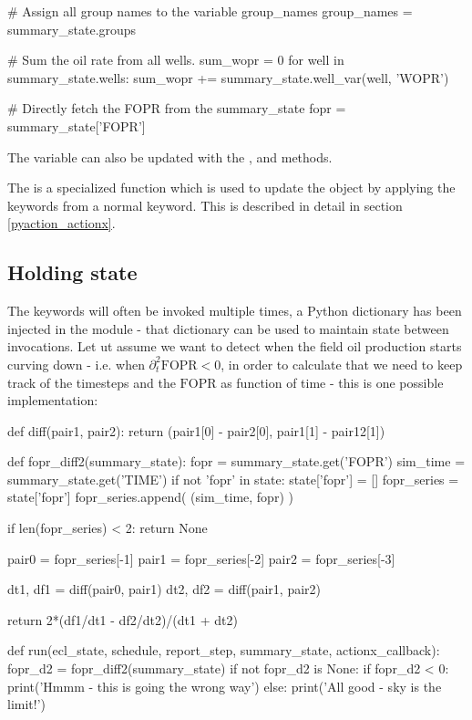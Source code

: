 \begin{description}
\begin{code}
    # Assign all group names to the variable group_names
    group_names = summary_state.groups

    # Sum the oil rate from all wells.
    sum_wopr = 0
    for well in summary_state.wells:
        sum_wopr += summary_state.well_var(well, 'WOPR')

    # Directly fetch the FOPR from the summary_state
    fopr = summary_state['FOPR'] 
  \end{code}
  The  variable can also be updated with the
  ,  and
   methods.
\item[\inlinecode{actionx\_callback}:] The  is a
  specialized function which is used to update the  object
  by applying the keywords from a normal \actionx{} keyword. This is described
  in detail in section \ref{pyaction_actionx}.
\end{description}

\subsection{Holding state}
The \pyaction{} keywords will often be invoked multiple times, a Python
dictionary  has been injected in the module - that dictionary
can be used to maintain state between invocations. Let ut assume we want to
detect when the field oil production starts curving down - i.e. when
$\partial^2_{t} \mathrm{FOPR} < 0$, in order to calculate that we need to keep
track of the timesteps and the $\mathrm{FOPR}$ as function of time - this is one
possible implementation:
\begin{code}
def diff(pair1, pair2):
    return (pair1[0] - pair2[0], pair1[1] - pair12[1])   

def fopr_diff2(summary_state):
    fopr = summary_state.get('FOPR')
    sim_time = summary_state.get('TIME')
    if not 'fopr' in state:
        state['fopr'] = []
    fopr_series = state['fopr']
    fopr_series.append( (sim_time, fopr) )

    if len(fopr_series) < 2:
       return None

    pair0 = fopr_series[-1]
    pair1 = fopr_series[-2]
    pair2 = fopr_series[-3]

    dt1, df1 = diff(pair0, pair1)
    dt2, df2 = diff(pair1, pair2)

    return 2*(df1/dt1 - df2/dt2)/(dt1 + dt2)

def run(ecl_state, schedule, report_step, summary_state, actionx_callback):
    fopr_d2 = fopr_diff2(summary_state)
    if not fopr_d2 is None:
       if fopr_d2 < 0:
           print('Hmmm - this is going the wrong way')
       else:
           print('All good - sky is the limit!')
\end{code}

